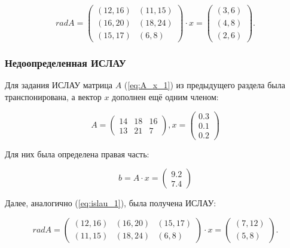 \documentclass[12pt,a4paper]{scrartcl}
\begin{document}
	\begin{equation}
		rad A = \left(
		\begin{array}{cc}
		(12, 16) & (11, 15) \\
		(16, 20) & (18, 24) \\
		(15, 17) & (6, 8)
		\end{array}
		\right) \cdot 
		x = \left(
		\begin{array}{c}
		(3, 6) \\
		(4, 8) \\
		(2, 6)
		\end{array}
		\right).
		\label{eq:islau_1}
	\end{equation}

\subsubsection{Недоопределенная ИСЛАУ}

Для задания ИСЛАУ матрица $A$ (\ref{eq:A_x_1}) из предыдущего раздела была транспонирована, а
вектор $x$ дополнен ещё одним членом:

\begin{equation}
		A = \left(
		\begin{array}{ccc}
		14 & 18 & 16\\
		13 & 21 & 7
		\end{array}
		\right),
		x = \left(
		\begin{array}{c}
		0.3 \\
		0.1 \\
		0.2
		\end{array}
		\right)
		\label{eq:A_x_2}
	\end{equation}

	Для них была определена правая часть:

	\begin{equation}
		b = A \cdot x = \left(
		\begin{array}{c}
		9.2 \\
		7.4
		\end{array}
		\right)
		\label{eq:b_2}
	\end{equation}

	Далее, аналогично (\ref{eq:islau_1}), была получена ИСЛАУ:

	\begin{equation}
		rad A = \left(
		\begin{array}{ccc}
		(12, 16) & (16, 20) & (15, 17) \\
		(11, 15) & (18, 24) & (6, 8)
		\end{array}
		\right) \cdot 
		x = \left(
		\begin{array}{c}
		(7, 12) \\
		(5, 8)
		\end{array}
		\right).
		\label{eq:islau_2}
	\end{equation}
\end{document}
